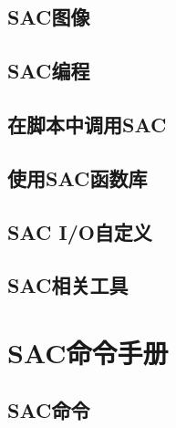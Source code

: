 \documentclass[a4paper, 11pt, twoside]{book}
\begin{document}
\chapter{SAC图像}
\label{chap:sac-graphics}







\chapter{SAC编程}
\label{chap:sac-programming}






\chapter{在脚本中调用SAC}
\label{chap:sac-script}




\chapter{使用SAC函数库}
\label{chap:sac-libs}





\chapter{SAC I/O自定义}
\label{chap:sac-custom-io}


\chapter{SAC相关工具}






\part{SAC命令手册}
\chapter{SAC命令}

\end{document}
